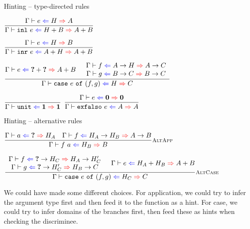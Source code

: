 \documentclass{beamer}
\begin{document}
\begin{frame}{Hinting -- type-directed rules}

\begin{center}
  $\infrule{\hinting{e}{H}{A}}{\hinting{\inl{e}}{\Sum{H}{B}}{\Sum{A}{B}}}$

  \vspace{2em}

  $\infrule{\hinting{e}{H}{B}}{\hinting{\inr{e}}{\Sum{A}{H}}{\Sum{A}{B}}}$

  \vspace{2em}

  $\infrule{\hinting{e}{\Sum{\Hole}{\Hole}}{\Sum{A}{B}} \quad \begin{array}{c} \hinting{f}{\Fun{A}{H}}{\Fun{A}{C}} \\ \hinting{g}{\Fun{B}{C}}{\Fun{B}{C}} \end{array}}{\hinting{\case{e}{f}{g}}{H}{C}}$

  \vspace{2em}

  $\infrule{}{\hinting{\unit}{\Unit}{\Unit}}$ \quad
  $\infrule{\hinting{e}{\Empty}{\Empty}}{\hinting{\exfalso{e}}{A}{A}}$
\end{center}

\end{frame}

\begin{frame}{Hinting -- alternative rules}

\begin{center}
  $\infrule[AltApp]{\hinting{a}{\Hole}{H_A} \quad \hinting{f}{\Fun{H_A}{H_B}}{\Fun{A}{B}}}{\hinting{\app{f}{a}}{H_B}{B}}$

  \vspace{2em}

  $\infrule[AltCase]{\begin{array}{c} \hinting{f}{\Fun{\Hole}{H_C}}{\Fun{H_A}{H_C'}} \\ \hinting{g}{\Fun{\Hole}{H_C'}}{\Fun{H_B}{C}} \end{array} \quad \hinting{e}{\Sum{H_A}{H_B}}{\Sum{A}{B}}}{\hinting{\case{e}{f}{g}}{H_C}{C}}$
\end{center}

\vspace{2em}

We could have made some different choices. For application, we could try to infer the argument type first and then feed it to the function as a hint. For case, we could try to infer domains of the branches first, then feed these as hints when checking the discriminee.

\end{frame}
\end{document}

